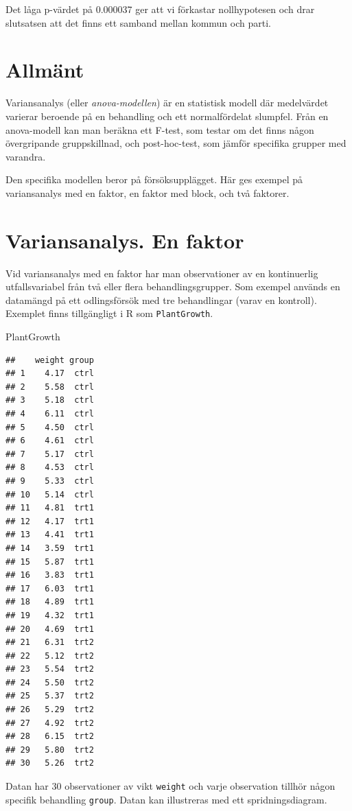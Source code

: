 \documentclass[
]{book}
\newenvironment{Shaded}{\begin{snugshade}}{\end{snugshade}}
\newcommand{\NormalTok}[1]{#1}
\theoremstyle{definition}
\theoremstyle{definition}
\theoremstyle{definition}
\theoremstyle{definition}
\theoremstyle{remark}
\begin{document}
Det låga p-värdet på 0.000037 ger att vi förkastar nollhypotesen och drar slutsatsen att det finns ett samband mellan kommun och parti.

\section{Allmänt}\label{allmuxe4nt}

Variansanalys (eller \emph{anova-modellen}) är en statistisk modell där medelvärdet varierar beroende på en behandling och ett normalfördelat slumpfel. Från en anova-modell kan man beräkna ett F-test, som testar om det finns någon övergripande gruppskillnad, och post-hoc-test, som jämför specifika grupper med varandra.

Den specifika modellen beror på försöksupplägget. Här ges exempel på variansanalys med en faktor, en faktor med block, och två faktorer.

\section{Variansanalys. En faktor}\label{variansanalys.-en-faktor}

Vid variansanalys med en faktor har man observationer av en kontinuerlig utfallsvariabel från två eller flera behandlingsgrupper. Som exempel används en datamängd på ett odlingsförsök med tre behandlingar (varav en kontroll). Exemplet finns tillgängligt i R som \texttt{PlantGrowth}.

\begin{Shaded}
\begin{Highlighting}[]
\NormalTok{PlantGrowth}
\end{Highlighting}
\end{Shaded}

\begin{verbatim}
##    weight group
## 1    4.17  ctrl
## 2    5.58  ctrl
## 3    5.18  ctrl
## 4    6.11  ctrl
## 5    4.50  ctrl
## 6    4.61  ctrl
## 7    5.17  ctrl
## 8    4.53  ctrl
## 9    5.33  ctrl
## 10   5.14  ctrl
## 11   4.81  trt1
## 12   4.17  trt1
## 13   4.41  trt1
## 14   3.59  trt1
## 15   5.87  trt1
## 16   3.83  trt1
## 17   6.03  trt1
## 18   4.89  trt1
## 19   4.32  trt1
## 20   4.69  trt1
## 21   6.31  trt2
## 22   5.12  trt2
## 23   5.54  trt2
## 24   5.50  trt2
## 25   5.37  trt2
## 26   5.29  trt2
## 27   4.92  trt2
## 28   6.15  trt2
## 29   5.80  trt2
## 30   5.26  trt2
\end{verbatim}

Datan har 30 observationer av vikt \texttt{weight} och varje observation tillhör någon specifik behandling \texttt{group}. Datan kan illustreras med ett spridningsdiagram.
\end{document}
